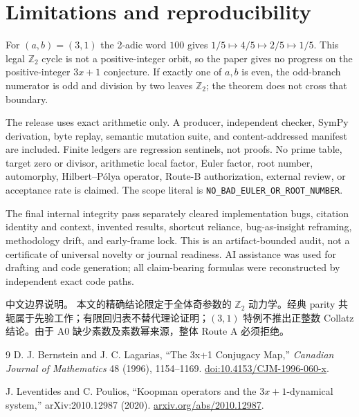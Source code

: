 \documentclass[10pt]{article}
\newcommand{\Ztwo}{\mathbb Z_2}
\begin{document}
\section{Limitations and reproducibility}
For $(a,b)=(3,1)$ the 2-adic word $100$ gives
$1/5\mapsto4/5\mapsto2/5\mapsto1/5$.  This legal $\Ztwo$ cycle is not a
positive-integer orbit, so the paper gives no progress on the positive-integer
$3x+1$ conjecture.  If exactly one of $a,b$ is even, the odd-branch
numerator is odd and division by two leaves $\Ztwo$; the theorem does not
cross that boundary.

The release uses exact arithmetic only.  A producer, independent checker,
SymPy derivation, byte replay, semantic mutation suite, and content-addressed
manifest are included.  Finite ledgers are regression sentinels, not proofs.
No prime table, target zero or divisor, arithmetic local factor, Euler factor,
root number, automorphy, Hilbert--P\'olya operator, Route-B authorization,
external review, or acceptance rate is claimed.  The scope literal is
\texttt{NO\_BAD\_EULER\_OR\_ROOT\_NUMBER}.

The final internal integrity pass separately cleared implementation bugs,
citation identity and context, invented results, shortcut reliance,
bug-as-insight reframing, methodology drift, and early-frame lock.  This is
an artifact-bounded audit, not a certificate of universal novelty or journal
readiness.  AI assistance was used for drafting and code generation; all
claim-bearing formulas were reconstructed by independent exact code paths.

\begin{otherlanguage}{chinese-simplified}
\noindent 中文边界说明。\quad
本文的精确结论限定于全体奇参数的 $\mathbb Z_2$ 动力学。经典 \foreignlanguage{english}{parity}
共轭属于先验工作；有限回归表不替代理论证明；$(3,1)$ 特例不推出正整数
\foreignlanguage{english}{Collatz} 结论。由于 \foreignlanguage{english}{A0} 缺少素数及素数幂来源，整体 \foreignlanguage{english}{Route A} 必须拒绝。
\end{otherlanguage}

\begin{thebibliography}{9}
D. J. Bernstein and J. C. Lagarias,
``The 3x+1 Conjugacy Map,''
\emph{Canadian Journal of Mathematics} 48 (1996), 1154--1169.
\href{https://doi.org/10.4153/CJM-1996-060-x}{doi:10.4153/CJM-1996-060-x}.

J. Leventides and C. Poulios,
``Koopman operators and the $3x+1$-dynamical system,''
arXiv:2010.12987 (2020).
\href{https://arxiv.org/abs/2010.12987}{arxiv.org/abs/2010.12987}.
\end{thebibliography}
\end{document}
